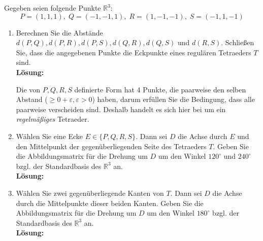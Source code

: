 \documentclass[11pt,a4paper,ngerman]{article}
\newcommand{\R}{\mathbb{R}}
\begin{document}
Gegeben seien folgende Punkte $\mathbb{R}^3:$
$$
P=(1,1,1),\; Q=(-1,-1,1),\; R=(1,-1,-1),\; S=(-1,1,-1)
$$
\begin{enumerate}[\bfseries (a)]

\item Berechnen Sie die Abstände $d(P,Q), d(P,R), d(P,S), d(Q,R), d(Q,S)$ und $d(R,S)$. Schließen Sie, dass die angegebenen Punkte die Eckpunkte eines regulären Tetraeders $T$ sind.\\

\textbf{Lösung:}


Die von $P,Q,R,S$ definierte Form hat 4 Punkte, die paarweise den selben Abstand ($\geq 0+ \varepsilon, \varepsilon > 0$) haben, darum erfüllen Sie die Bedingung, dass alle paarweise verscheiden sind. Deshalb handelt es sich hier bei um ein \emph{regelmäßiges} Tetraeder.


\item Wählen Sie eine Ecke $E \in \{  P,Q,R,S\} $. Dann sei $D$ die Achse durch $E$ und den Mittelpunkt der gegenüberliegenden Seite des Tetraeders $T$. Geben Sie die Abbildungsmatrix für die Drehung um $D$ um den Winkel $120^\circ$ und $240^\circ$ bzgl. der Standardbasis des $\R ^3$ an.\\

\textbf{Lösung:}

\item Wählen Sie zwei gegenüberliegende Kanten von $T$. Dann sei $D$ die Achse durch die Mittelpunkte dieser beiden Kanten. Geben Sie die Abbildungsmatrix für die Drehung um $D$ um den Winkel $180^\circ$ bzgl. der Standardbasis des $\R ^3$ an. \\

\textbf{Lösung:}

\end{enumerate}
\end{document}
